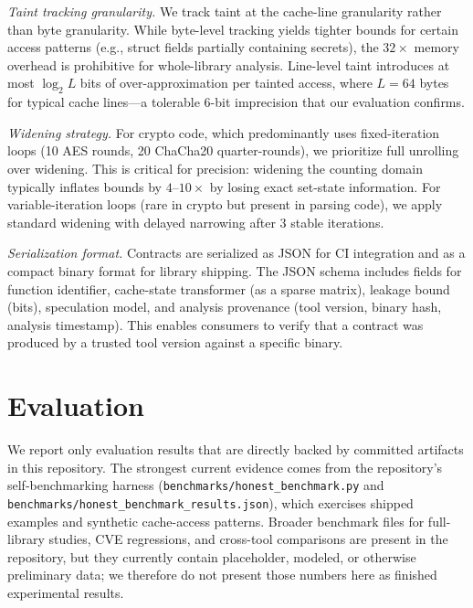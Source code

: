 \documentclass{article}
\theoremstyle{definition}
\theoremstyle{remark}
\begin{document}
\emph{Taint tracking granularity.}
We track taint at the cache-line granularity rather than byte granularity.
While byte-level tracking yields tighter bounds for certain access patterns
(e.g., struct fields partially containing secrets), the $32\times$ memory
overhead is prohibitive for whole-library analysis.  Line-level taint introduces
at most $\log_2 L$ bits of over-approximation per tainted access, where
$L = 64$ bytes for typical cache lines---a tolerable $6$-bit imprecision
that our evaluation confirms.

\emph{Widening strategy.}
For crypto code, which predominantly uses fixed-iteration loops (10 AES rounds,
20 ChaCha20 quarter-rounds), we prioritize full unrolling over widening.  This
is critical for precision: widening the counting domain typically inflates
bounds by $4$--$10\times$ by losing exact set-state information.  For
variable-iteration loops (rare in crypto but present in parsing code), we
apply standard widening with delayed narrowing after 3 stable iterations.

\emph{Serialization format.}
Contracts are serialized as JSON for CI integration and as a compact binary
format for library shipping.  The JSON schema includes fields for function
identifier, cache-state transformer (as a sparse matrix), leakage bound
(bits), speculation model, and analysis provenance (tool version, binary hash,
analysis timestamp).  This enables consumers to verify that a contract was
produced by a trusted tool version against a specific binary.

\section{Evaluation}
\label{sec:eval}

We report only evaluation results that are directly backed by committed
artifacts in this repository. The strongest current evidence comes from the
repository's self-benchmarking harness (\texttt{benchmarks/honest\_benchmark.py}
and \texttt{benchmarks/honest\_benchmark\_results.json}), which exercises
shipped examples and synthetic cache-access patterns. Broader benchmark files
for full-library studies, CVE regressions, and cross-tool comparisons are
present in the repository, but they currently contain placeholder, modeled, or
otherwise preliminary data; we therefore do not present those numbers here as
finished experimental results.
\end{document}
